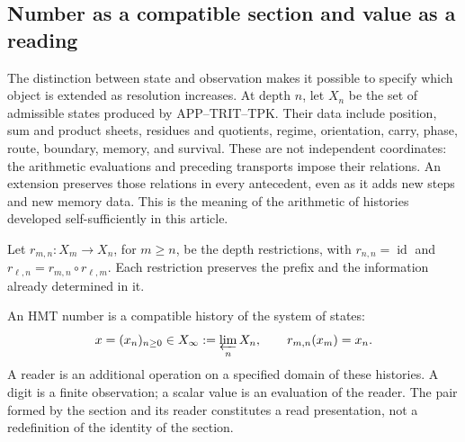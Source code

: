 
\subsection{Number as a compatible section and value as a reading}
\label{hist:seccion}

The distinction between state and observation makes it possible to specify which object is
extended as resolution increases. At depth \(n\), let \(X_n\)
be the set of admissible states produced by APP--TRIT--TPK. Their data
include position, sum and product sheets, residues and quotients, regime,
orientation, carry, phase, route, boundary, memory, and survival. These are not
independent coordinates: the arithmetic evaluations and preceding transports
impose their relations. An extension preserves those relations in every
antecedent, even as it adds new steps and new memory data.
This is the meaning of the arithmetic of histories developed self-sufficiently
in this article.

Let \(r_{m,n}:X_m\to X_n\), for \(m\geq n\), be the depth
restrictions, with \(r_{n,n}=\operatorname{id}\) and
\(r_{\ell,n}=r_{m,n}\circ r_{\ell,m}\). Each restriction preserves the
prefix and the information already determined in it.

\begin{definition}
An HMT number is a compatible history of the system of states:
\begin{equation}
 x=(x_n)_{n\geq0}\in X_\infty:=\varprojlim_n X_n,
 \qquad r_{m,n}(x_m)=x_n.
 \label{hist:limite-inverso}
\end{equation}
A reader is an additional operation on a specified domain of these
histories. A digit is a finite observation; a scalar value is an
evaluation of the reader. The pair formed by the section and its reader constitutes
a read presentation, not a redefinition of the identity of the section.
\end{definition}

